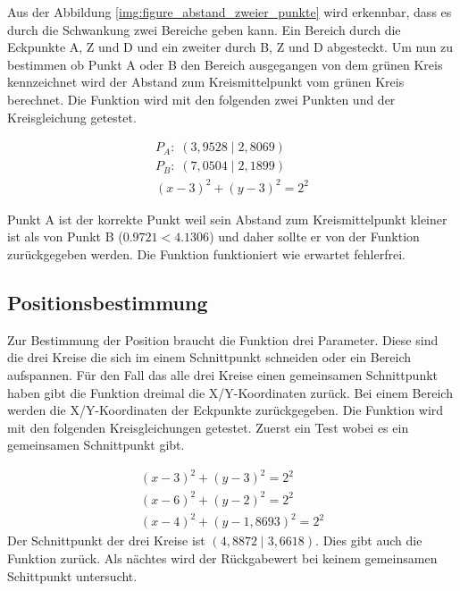 Aus der Abbildung \ref{img:figure_abstand_zweier_punkte} wird erkennbar, dass es durch die Schwankung zwei Bereiche geben kann. Ein Bereich durch die Eckpunkte \si{A}, \si{Z} und \si{D} und ein zweiter durch \si{B}, \si{Z} und \si{D} abgesteckt. Um nun zu bestimmen ob Punkt \si{A} oder \si{B} den Bereich ausgegangen von dem grünen Kreis kennzeichnet wird der Abstand zum Kreismittelpunkt vom grünen Kreis berechnet. Die Funktion wird mit den folgenden zwei Punkten und der Kreisgleichung getestet.

\begin{equation*}
\label{eq:unit_test_abstand_zweier_punkte}
\begin{split}
P_{A}: \; (3,9528 \;|\; 2,8069)\\
P_{B}: \; (7,0504 \;|\; 2,1899)\\
(x - 3)^{2} + (y - 3)^{2} = 2^{2}
\end{split}
\end{equation*}

Punkt \si{A} ist der korrekte Punkt weil sein Abstand zum Kreismittelpunkt kleiner ist als von Punkt \si{B} ($0.9721 < 4.1306$) und daher sollte er von der Funktion zurückgegeben werden. Die Funktion funktioniert wie erwartet fehlerfrei.

\subsection{Positionsbestimmung}
Zur Bestimmung der Position braucht die Funktion drei Parameter. Diese sind die drei Kreise die sich im einem Schnittpunkt schneiden oder ein Bereich aufspannen. Für den Fall das alle drei Kreise einen gemeinsamen Schnittpunkt haben gibt die Funktion dreimal die X/Y-Koordinaten zurück. Bei einem Bereich werden die X/Y-Koordinaten der Eckpunkte zurückgegeben. Die Funktion wird mit den folgenden Kreisgleichungen getestet.  Zuerst ein Test wobei es ein gemeinsamen Schnittpunkt gibt.

\begin{equation*}
\label{eq:unit_test_positionsbestimmung}
\begin{split}
(x - 3)^{2} + (y - 3)^{2} = 2^{2} \\
(x - 6)^{2} + (y - 2)^{2} = 2^{2} \\
(x - 4)^{2} + (y - 1,8693)^{2} = 2^{2}
\end{split}
\end{equation*}
Der Schnittpunkt der drei Kreise ist $( 4,8872 \;|\; 3,6618)$. Dies gibt auch die Funktion zurück. Als nächtes wird der Rückgabewert bei keinem gemeinsamen Schittpunkt untersucht.

